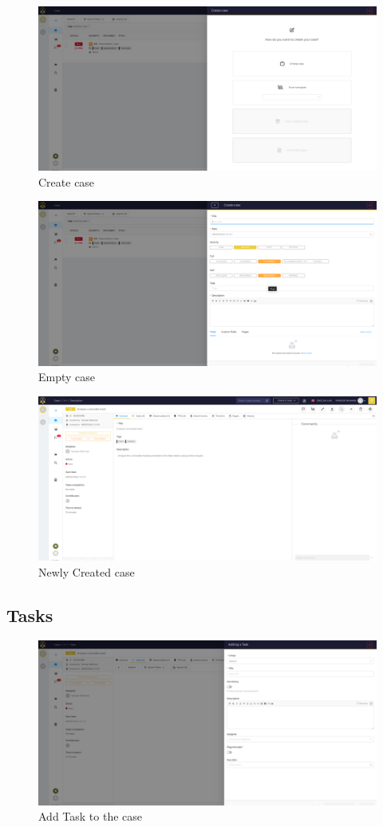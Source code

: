 \documentclass{book}
\begin{document}
\begin{figure}[h]
    \centering
    \includegraphics[width=.8\linewidth]{Case_images/Case Demo/CreateCase.png}
    \caption{Create case }
    \label{fig:create_case}
\end{figure}
\bigskip
\bigskip
\begin{figure}[h]
    \centering
    \includegraphics[width=.8\linewidth]{Case_images/Case Demo/empty_case.png}
    \caption{Empty case }
    \label{fig:empty_case}
\end{figure}
\newpage

\begin{figure}[h]
    \centering
    \includegraphics[width=.7\linewidth]{Case_images/Case Demo/newly_created_case.png}
    \caption{Newly Created case }
    \label{fig:newly_created_case}
\end{figure}

\subsection{Tasks}
\begin{figure}[h]
    \centering
    \includegraphics[width=.7\linewidth]{Case_images/Case Demo/Add_task.png}
    \caption{Add Task to the case }
    \label{fig:add_task}
\end{figure}
\end{document}
